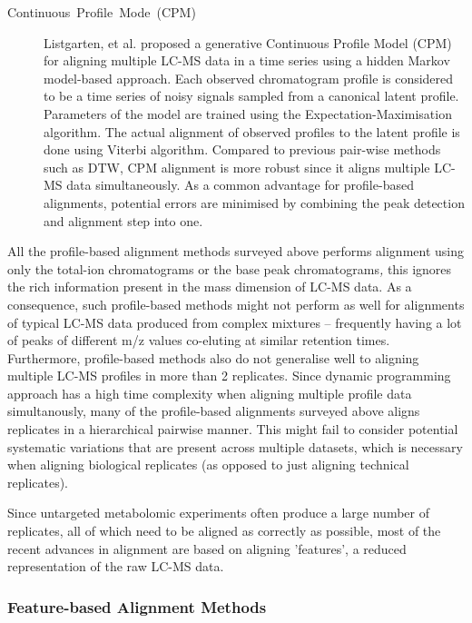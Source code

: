 \begin{description}
\item [{Continuous~Profile~Mode~(CPM)}] Listgarten, et al. \cite{Listgarten2005} proposed a generative Continuous Profile Model (CPM) for aligning multiple LC-MS data in a time series using a hidden Markov model-based approach. Each observed chromatogram profile is considered to be a time series of noisy signals sampled from a canonical latent profile. Parameters of the model are trained using the Expectation-Maximisation algorithm. The actual alignment of observed profiles to the latent profile is done using Viterbi algorithm. Compared to previous pair-wise methods such as DTW, CPM alignment is more robust since it aligns multiple LC-MS data simultaneously. As a common advantage for profile-based alignments, potential errors are minimised by combining the peak detection and alignment step into one.

\end{description}

All the profile-based alignment methods surveyed above performs alignment using only the total-ion chromatograms or the base peak chromatograms\emph{, }this ignores the rich information present in the mass dimension of LC-MS data. As a consequence, such profile-based methods might not perform as well for alignments of typical LC-MS data produced from complex mixtures -- frequently having a lot of peaks of different m/z values co-eluting at similar retention times. Furthermore, profile-based methods also do not generalise well to aligning multiple LC-MS profiles in more than 2 replicates. Since dynamic programming approach has a high time complexity when aligning multiple profile data simultanously, many of the profile-based alignments surveyed above aligns replicates in a hierarchical pairwise manner. This might fail to consider potential systematic variations that are present across multiple datasets, which is necessary when aligning biological replicates (as opposed to just aligning technical replicates).

Since untargeted metabolomic experiments often produce a large number of replicates, all of which need to be aligned as correctly as possible, most of the recent advances in alignment are based on aligning 'features', a reduced representation of the raw LC-MS data.

\subsubsection{\label{sub:Feature-based-Alignment-Methods}Feature-based Alignment
Methods}

